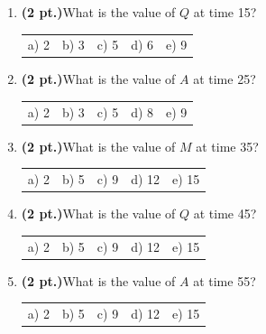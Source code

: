 \documentclass{article}
\begin{document}
\begin{enumerate}
\item {\bf (2 pt.)}What is the value of $Q$ at time 15?

\begin{tabular}{p{0.6in} p{0.6in} p{0.6in} p{0.6in} l}
a) 2 & b) 3 & c) 5 & d) 6 & e) 9
\end{tabular}

\item {\bf (2 pt.)}What is the value of $A$ at time 25?

\begin{tabular}{p{0.6in} p{0.6in} p{0.6in} p{0.6in} l}
a) 2 & b) 3 & c) 5 & d) 8 & e) 9
\end{tabular}

\item {\bf (2 pt.)}What is the value of $M$ at time 35?

\begin{tabular}{p{0.6in} p{0.6in} p{0.6in} p{0.6in} l}
a) 2 & b) 5 & c) 9 & d) 12 & e) 15
\end{tabular}

\item {\bf (2 pt.)}What is the value of $Q$ at time 45?

\begin{tabular}{p{0.6in} p{0.6in} p{0.6in} p{0.6in} l}
a) 2 & b) 5 & c) 9 & d) 12 & e) 15
\end{tabular}

\item {\bf (2 pt.)}What is the value of $A$ at time 55?

\begin{tabular}{p{0.6in} p{0.6in} p{0.6in} p{0.6in} l}
a) 2 & b) 5 & c) 9 & d) 12 & e) 15
\end{tabular}

\pagebreak


\end{enumerate}
\end{document}
